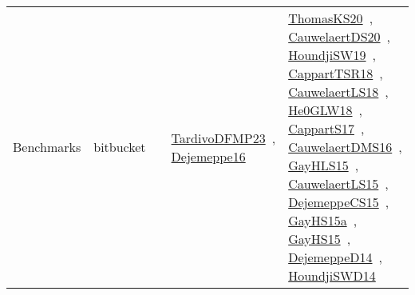 {\begin{longtable}{lp{3cm}>{\raggedright\arraybackslash}p{6cm}>{\raggedright\arraybackslash}p{6cm}>{\raggedright\arraybackslash}p{8cm}}
\index{bitbucket}\index{Benchmarks!bitbucket}Benchmarks & bitbucket &  & \href{../works/TardivoDFMP23.pdf}{TardivoDFMP23}~\cite{TardivoDFMP23}, \href{../works/Dejemeppe16.pdf}{Dejemeppe16}~\cite{Dejemeppe16} & \href{../works/ThomasKS20.pdf}{ThomasKS20}~\cite{ThomasKS20}, \href{../works/CauwelaertDS20.pdf}{CauwelaertDS20}~\cite{CauwelaertDS20}, \href{../works/HoundjiSW19.pdf}{HoundjiSW19}~\cite{HoundjiSW19}, \href{../works/CappartTSR18.pdf}{CappartTSR18}~\cite{CappartTSR18}, \href{../works/CauwelaertLS18.pdf}{CauwelaertLS18}~\cite{CauwelaertLS18}, \href{../works/He0GLW18.pdf}{He0GLW18}~\cite{He0GLW18}, \href{../works/CappartS17.pdf}{CappartS17}~\cite{CappartS17}, \href{../works/CauwelaertDMS16.pdf}{CauwelaertDMS16}~\cite{CauwelaertDMS16}, \href{../works/GayHLS15.pdf}{GayHLS15}~\cite{GayHLS15}, \href{../works/CauwelaertLS15.pdf}{CauwelaertLS15}~\cite{CauwelaertLS15}, \href{../works/DejemeppeCS15.pdf}{DejemeppeCS15}~\cite{DejemeppeCS15}, \href{../works/GayHS15a.pdf}{GayHS15a}~\cite{GayHS15a}, \href{../works/GayHS15.pdf}{GayHS15}~\cite{GayHS15}, \href{../works/DejemeppeD14.pdf}{DejemeppeD14}~\cite{DejemeppeD14}, \href{../works/HoundjiSWD14.pdf}{HoundjiSWD14}~\cite{HoundjiSWD14}\\

\end{longtable}}

